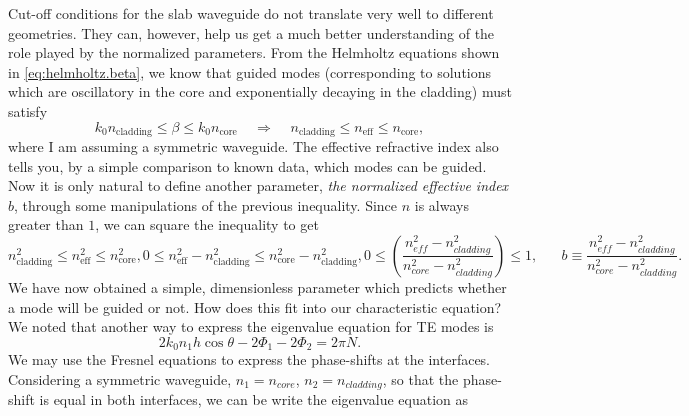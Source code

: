 Cut-off conditions for the slab waveguide do not translate very well to different geometries. They can, however, help us get a much better understanding of the role played by the normalized parameters. From the Helmholtz equations shown in \ref{eq:helmholtz.beta}, we know that guided modes (corresponding to solutions which are oscillatory in the core and exponentially decaying in the cladding) must satisfy
\begin{equation}
    k_0n_{\text{cladding}}\le \beta \le k_0n_{\text{core}}\;\;\;\;\Rightarrow\;\;\;\;n_{\text{cladding}}\le n_{\text{eff}}\le n_{\text{core}},
\end{equation}
where I am assuming a symmetric waveguide. The effective refractive index also tells you, by a simple comparison to known data, which modes can be guided. Now it is only natural to define another parameter, \textit{the normalized effective index} $b$, through some manipulations of the previous inequality. Since $n$ is always greater than $1$, we can square the inequality to get
\begin{subequations}
    \begin{equation}
        n^2_{\text{cladding}}\le n^2_{\text{eff}}\le n^2_{\text{core}},
    \end{equation}
    \begin{equation}
        0\le n^2_{\text{eff}}-n^2_{\text{cladding}}\le n^2_{\text{core}}-n^2_{\text{cladding}},
    \end{equation}
    \begin{equation}
        0\le\left(\frac{n^2_{eff}-n^2_{cladding}}{n^2_{core}-n^2_{cladding}}\right)\le 1,\;\;\;\;\;\;b\equiv\frac{n^2_{eff}-n^2_{cladding}}{n^2_{core}-n^2_{cladding}}.
    \end{equation}
\end{subequations}
We have now obtained a simple, dimensionless parameter which predicts whether a mode will be guided or not. How does this fit into our characteristic equation? We noted that another way to express the eigenvalue equation for TE modes is
\begin{equation}
    2k_0n_1h\cos\theta-2\Phi_1-2\Phi_2=2\pi N.
\end{equation}
We may use the Fresnel equations to express the phase-shifts at the interfaces. Considering a symmetric waveguide, $n_1=n_{core}$, $n_2=n_{cladding}$, so that the phase-shift is equal in both interfaces, we can be write the eigenvalue equation as
